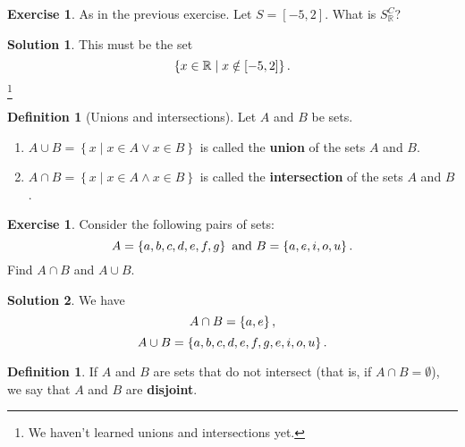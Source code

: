 \documentclass[a4paper, 11pt]{report}
\theoremstyle{plain}
\theoremstyle{definition}
\newtheorem{defn}[thm]{Definition}
\newtheorem{exrc}[thm]{Exercise}
\newtheorem*{sltn}{Solution}
\newcommand{\union}{\cup}
\newcommand{\intrsct}{\cap}
\begin{document}
\begin{exrc}
As in the previous exercise. Let $S = \left[ -5, 2 \right]$. What is $S_\mathbb{R}^C$? 
\end{exrc}
\begin{sltn}
  This must be the set
  \begin{equation}
    \notag
    \left\{ x \in \mathbb{R} \mid x \notin \left[ -5, 2 \right] \right\}.
  \end{equation}\footnote{We haven't learned unions and intersections yet.}
\end{sltn}

\begin{defn}[Unions and intersections]
  Let $A$ and $B$ be sets.
  \begin{enumerate}
    \item $A \union B = \left\{x \mid  x \in A \lor x \in B \right\}$ is called the \textbf{union}\index{$\union$} of the sets $A$ and $B$.
    \item $A \intrsct B = \left\{ x \mid x \in A \land x \in B \right\}$ is called the \textbf{intersection}\index{$\intrsct$} of the sets $A$ and $B$.
  \end{enumerate}
\end{defn}

\begin{exrc}
  Consider the following pairs of sets:
  \begin{equation}
    \notag
    A = \left\{ a, b, c, d, e, f, g \right\} \text{ and } B = \left\{ a, e, i, o, u \right\}.
  \end{equation}
  Find $A \intrsct B$ and $A \union B$.
\end{exrc}

\begin{sltn}
  We have
  \begin{equation}
    \notag
    A \intrsct B = \left\{ a, e \right\}, 
  \end{equation}
  \begin{equation}
    \notag
    A \union B = \left\{ a, b, c, d, e, f, g, e, i, o, u \right\}.
  \end{equation}
\end{sltn}

\begin{defn}
  If $A$ and $B$ are sets that do not intersect (that is, if $A \intrsct B =
  \emptyset$), we say that $A$ and $B$ are \textbf{disjoint}.
\end{defn}
\end{document}
